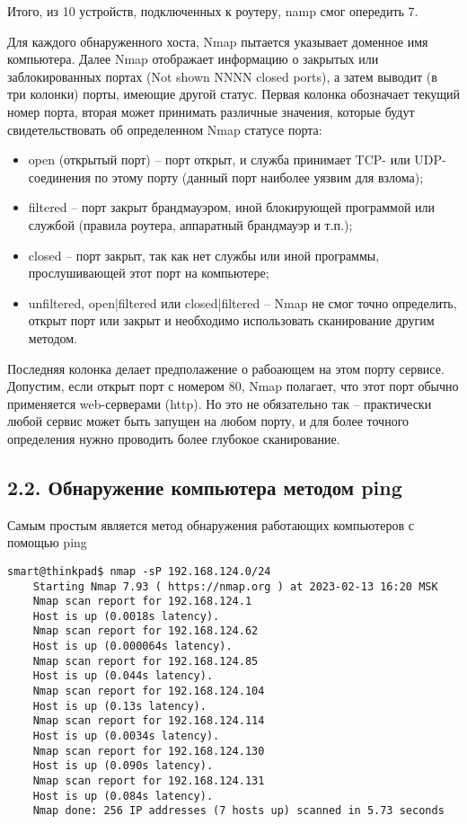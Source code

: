 Итого, из 10 устройств, подключенных к роутеру, namp смог опередить 7.

Для каждого обнаруженного хоста, Nmap пытается указывает доменное имя компьютера. Далее Nmap отображает информацию о закрытых или заблокированных портах (Not shown NNNN closed ports), а затем выводит (в три колонки) порты, имеющие другой статус. Первая колонка обозначает текущий номер порта, вторая может принимать различные значения, которые будут свидетельствовать об определенном Nmap статусе порта:

\begin{itemize}
    \item open (открытый порт) -- порт открыт, и служба принимает TCP- или UDP-соединения по этому порту (данный порт наиболее уязвим для взлома);
    \item filtered -- порт закрыт брандмауэром, иной блокирующей программой или службой (правила роутера, аппаратный брандмауэр и т.п.);
    \item closed -- порт закрыт, так как нет службы или иной программы, прослушивающей этот порт на компьютере;
    \item unfiltered, open|filtered или closed|filtered -- Nmap не смог точно определить, открыт порт или закрыт и необходимо использовать сканирование другим методом.
\end{itemize}

Последняя колонка делает предполажение о рабоающем на этом порту сервисе. Допустим, если открыт порт с номером 80, Nmap полагает, что этот порт обычно применяется web-серверами (http). Но это не обязательно так -- практически любой сервис может быть запущен на любом порту, и для более точного определения нужно проводить более глубокое сканирование.

\subsection*{2.2. Обнаружение компьютера методом ping}

Самым простым является метод обнаружения работающих компьютеров с помощью ping
\begin{Verbatim}[frame=single,breaklines=true,breakanywhere=true]
    smart@thinkpad$ nmap -sP 192.168.124.0/24
    Starting Nmap 7.93 ( https://nmap.org ) at 2023-02-13 16:20 MSK
    Nmap scan report for 192.168.124.1
    Host is up (0.0018s latency).
    Nmap scan report for 192.168.124.62
    Host is up (0.000064s latency).
    Nmap scan report for 192.168.124.85
    Host is up (0.044s latency).
    Nmap scan report for 192.168.124.104
    Host is up (0.13s latency).
    Nmap scan report for 192.168.124.114
    Host is up (0.0034s latency).
    Nmap scan report for 192.168.124.130
    Host is up (0.090s latency).
    Nmap scan report for 192.168.124.131
    Host is up (0.084s latency).
    Nmap done: 256 IP addresses (7 hosts up) scanned in 5.73 seconds
\end{Verbatim}

